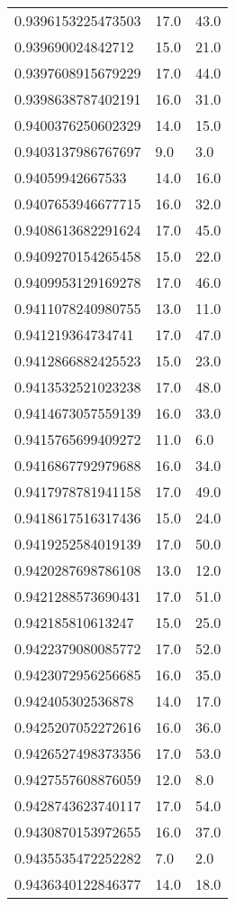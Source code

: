 \begin{center}
\begin{supertabular}[H]{p{0.30\textwidth}p{0.05\textwidth}p{0.05\textwidth}}
0.9396153225473503 & 17.0 & 43.0 \\ 
0.939690024842712 & 15.0 & 21.0 \\ 
0.9397608915679229 & 17.0 & 44.0 \\ 
0.9398638787402191 & 16.0 & 31.0 \\ 
0.9400376250602329 & 14.0 & 15.0 \\ 
0.9403137986767697 & 9.0 & 3.0 \\ 
0.94059942667533 & 14.0 & 16.0 \\ 
0.9407653946677715 & 16.0 & 32.0 \\ 
0.9408613682291624 & 17.0 & 45.0 \\ 
0.9409270154265458 & 15.0 & 22.0 \\ 
0.9409953129169278 & 17.0 & 46.0 \\ 
0.9411078240980755 & 13.0 & 11.0 \\ 
0.941219364734741 & 17.0 & 47.0 \\ 
0.9412866882425523 & 15.0 & 23.0 \\ 
0.9413532521023238 & 17.0 & 48.0 \\ 
0.9414673057559139 & 16.0 & 33.0 \\ 
0.9415765699409272 & 11.0 & 6.0 \\ 
0.9416867792979688 & 16.0 & 34.0 \\ 
0.9417978781941158 & 17.0 & 49.0 \\ 
0.9418617516317436 & 15.0 & 24.0 \\ 
0.9419252584019139 & 17.0 & 50.0 \\ 
0.9420287698786108 & 13.0 & 12.0 \\ 
0.9421288573690431 & 17.0 & 51.0 \\ 
0.942185810613247 & 15.0 & 25.0 \\ 
0.9422379080085772 & 17.0 & 52.0 \\ 
0.9423072956256685 & 16.0 & 35.0 \\ 
0.942405302536878 & 14.0 & 17.0 \\ 
0.9425207052272616 & 16.0 & 36.0 \\ 
0.9426527498373356 & 17.0 & 53.0 \\ 
0.9427557608876059 & 12.0 & 8.0 \\ 
0.9428743623740117 & 17.0 & 54.0 \\ 
0.9430870153972655 & 16.0 & 37.0 \\ 
0.9435535472252282 & 7.0 & 2.0 \\ 
0.9436340122846377 & 14.0 & 18.0 \\ 

\end{supertabular}
\end{center}
